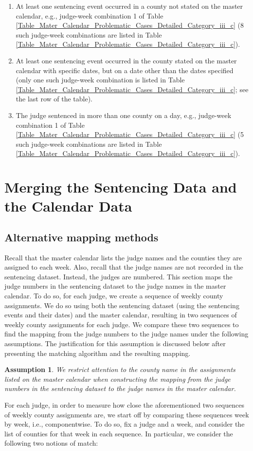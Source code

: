 \documentclass[11pt, oneside]{article}   	%
\theoremstyle{ModifiedStyle}
\newtheorem{assumption}{Assumption}
\begin{document}
      \begin{enumerate}
        \item At least one sentencing event occurred in a county not stated on the master calendar, e.g., judge-week combination 1 of Table \ref{Table_Mater_Calendar_Problematic_Cases_Detailed_Category_iii_c} (8 such judge-week combinations are listed in Table \ref{Table_Mater_Calendar_Problematic_Cases_Detailed_Category_iii_c}).
        \item At least one sentencing event occurred in the county stated on the master calendar with specific dates, but on a date other than the dates specified (only one such judge-week combination is listed in Table \ref{Table_Mater_Calendar_Problematic_Cases_Detailed_Category_iii_c}; see the last row of the table).
        \item The judge sentenced in more than one county on a day, e.g., judge-week combination 1 of Table \ref{Table_Mater_Calendar_Problematic_Cases_Detailed_Category_iii_c} (5 such judge-week combinations are listed in Table \ref{Table_Mater_Calendar_Problematic_Cases_Detailed_Category_iii_c}).
      \end{enumerate}

\section{Merging the Sentencing Data and the Calendar Data}
  \label{app-map}
  \subsection{Alternative mapping methods}
    Recall that the master calendar lists the judge names and the counties they are assigned to each week. Also, recall that the judge names are not recorded in the sentencing dataset. Instead, the judges are numbered. This section maps the judge numbers in the sentencing dataset to the judge names in the master calendar. To do so, for each judge, we create a sequence of weekly county assignments. We do so using both the sentencing dataset (using the sentencing events and their dates) and the master calendar, resulting in two sequences of weekly county assignments for each judge. We compare these two sequences to find the mapping from the judge numbers to the judge names under the following assumptions. The justification for this assumption is discussed below after presenting the matching algorithm and the resulting mapping.
  	\begin{assumption}
  		We restrict attention to the county name in the assignments listed on the master calendar when constructing the mapping from the judge numbers in the sentencing dataset to the judge names in the master calendar.
  		\label{Assumption_Mapping_Only_County_Assignment_Matter}
  	\end{assumption}
  	For each judge, in order to measure how close the aforementioned two sequences of weekly county assignments are, we start off by comparing these sequences week by week, i.e., componentwise. To do so, fix a judge and a week, and consider the list of counties for that week in each sequence. In particular, we consider the following two notions of match:
  	\vspace{-3mm}
\end{document}
